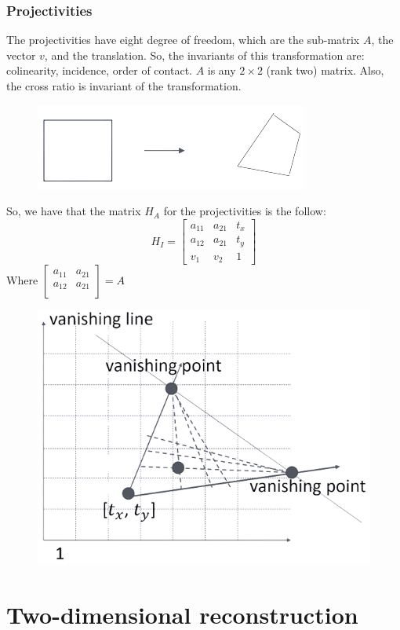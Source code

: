 \documentclass[12pt, a4paper]{report}
\newtheorem[style=M,bodystyle=\normalfont]{theorem}{Theorem}
\newtheorem[style=M,bodystyle=\normalfont]{corollary}{Corollary}
\newtheorem[style=M,bodystyle=\normalfont]{lemma}{Lemma}
\newtheorem[style=M,bodystyle=\normalfont]{definition}{Definition}
\begin{document}
    \subsection{Projectivities}
    The projectivities have eight degree of freedom, which are the sub-matrix $A$, the vector $v$, and the translation. So, the invariants of this transformation are: colinearity, incidence, order of contact.
    $A$ is any $2 \times 2$ (rank two) matrix. Also, the cross ratio is invariant of the transformation.
    \begin{figure}[H]
        \centering
        \includegraphics[width=0.5\linewidth]{images/projectivities.png}
    \end{figure}
    So, we have that the matrix $H_A$ for the projectivities is the follow: 
    \[H_I=
    \begin{bmatrix}
        a_{11} & a_{21} & t_x \\
        a_{12} & a_{21} & t_y \\
        v_1 & v_2 & 1
    \end{bmatrix}\]
    Where $
    \begin{bmatrix}
        a_{11} & a_{21} \\
        a_{12} & a_{21} \\
    \end{bmatrix}
    =A$
    \begin{figure}[H]
        \centering
        \includegraphics[width=0.5\linewidth]{images/projectivities1.png}
    \end{figure}

\newpage

\chapter{Two-dimensional reconstruction}
\end{document}
